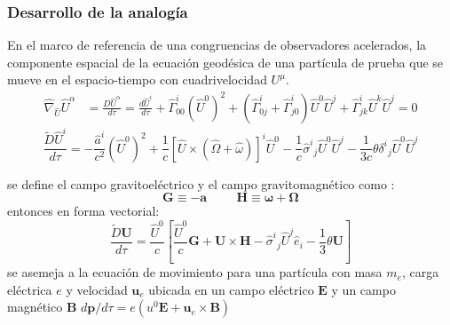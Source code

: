 \documentclass[aspectratio=169,10pt,usenames,dvipsnames,spanish]{beamer}
\newcommand{\ve}[1]{\mathbf{#1}}    %
\newcommand{\vg}[1]{\boldsymbol{#1}}   %
\begin{document}

\begin{frame}
\frametitle{Desarrollo de la analogía}
En el marco de referencia de una congruencias de observadores acelerados, la componente espacial de la ecuación geodésica de una partícula de prueba que se mueve en el espacio-tiempo con cuadrivelocidad $U^{\mu}$.
    \begin{align*}
	\nonumber \hat{\nabla}_{\hat{U}}\hat{U}^{\alpha}&=\frac{D\hat{U}^{\alpha}}{d\tau}=    \frac{d\hat{U}^{i}}{d\tau}+ \hat{\Gamma}^{i}_{00} (\hat{U}^{0})^{2} + (\hat{\Gamma}^{i}_{0j} + \hat{\Gamma}^{i}_{j0}) \hat{U}^{0} \hat{U}^{j}+ \hat{\Gamma}^{i}_{jk} \hat{U}^{k} \hat{U}^{j} = 0
\end{align*}
\begin{equation}
	\frac{\tilde{D}\hat{U}^i}{d\tau}=-\frac{\hat{a}^i}{c^2} (\hat{U}^{0})^{2}+\frac{1}{c} [\hat{U}\times (\hat{\Omega}+\hat{\omega})]^i\hat{U}^{0}-\frac{1}{c}\hat{\sigma}^{i}{}_{j}\hat{U}^{0} \hat{U}^{j}-\frac{1}{3c}\theta\delta^i{}_{j}\hat{U}^{0} \hat{U}^{j}
\end{equation}

se define el campo gravitoeléctrico y el campo gravitomagnético como \parencite{Costa2014}:
\begin{equation}\label{CGEM_inerciales}
	\ve{G}\equiv-\ve{a} \hspace{1cm} \ve{H}\equiv\vg{\omega}+\vg{\Omega}
\end{equation}
entonces en forma vectorial:
\begin{equation}\label{FLorentz_inerciales}
	\frac{\tilde{D} \ve{U}}{d\tau}=\frac{\hat{U}^0}{c}\left[\frac{\hat{U}^0}{c} \ve{G}+\ve{U} \times \ve{H}-\hat{\sigma}^{i}{}_{j} \hat{U}^{j} \hat{e}_{i}-\frac{1}{3}\theta\ve{U}\right]
\end{equation}
se asemeja a la ecuación de movimiento para una partícula con masa $m_e$, carga eléctrica $e$ y velocidad $\ve{u}_e$ ubicada en un campo eléctrico $\ve{E}$ y un campo magnético $\ve{B}$ $d\ve{p}/d\tau=e(u^0\ve{E}+\ve{u}_e\times\ve{B})$ \parencite{Misner1973,MunizOliva2002}
\end{frame}

\end{document}
